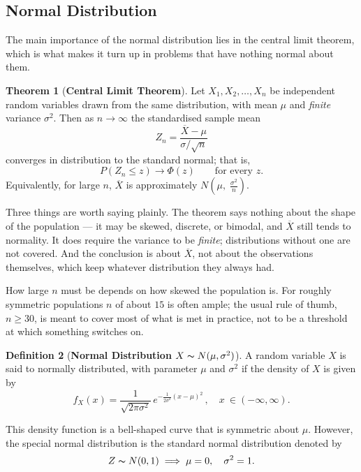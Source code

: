 \documentclass[12pt,a4paper]{report}
\theoremstyle{definition}
\newtheorem{thm}{Theorem}[section]
\newtheorem{definition}[thm]{Definition}
\theoremstyle{plain}
\theoremstyle{definition}
\begin{document}
\subsection{Normal Distribution}
\vspace{-15pt}
The main importance of the normal distribution lies in the central limit theorem, which is
what makes it turn up in problems that have nothing normal about them.

\begin{thm}[\textbf{Central Limit Theorem}]
Let $X_1, X_2, \ldots, X_n$ be independent random variables drawn from the same
distribution, with mean $\mu$ and \emph{finite} variance $\sigma^2$. Then as
$n\to\infty$ the standardised sample mean
\[Z_n=\frac{\overline{X}-\mu}{\sigma/\sqrt{n}}\]
converges in distribution to the standard normal; that is,
\[P(Z_n\leq z)\longrightarrow \Phi(z)\qquad\text{for every }z.\]
Equivalently, for large $n$, $\overline{X}$ is approximately
$N\!\left(\mu,\;\frac{\sigma^2}{n}\right)$.
\end{thm}

Three things are worth saying plainly. The theorem says nothing about the shape of the
population --- it may be skewed, discrete, or bimodal, and $\overline{X}$ still tends to
normality. It does require the variance to be \emph{finite}; distributions without one are
not covered. And the conclusion is about $\overline{X}$, not about the observations
themselves, which keep whatever distribution they always had.

How large $n$ must be depends on how skewed the population is. For roughly symmetric
populations $n$ of about $15$ is often ample; the usual rule of thumb, $n\geq 30$, is
meant to cover most of what is met in practice, not to be a threshold at which something
switches on. 



\begin{definition}[\textbf{Normal Distribution $X\thicksim N(\mu,\sigma^2)$}]
A random variable $X$ is said to normally distributed, with parameter $\mu$ and $\sigma^2$ if the density of $X$ is given by
\[f_X(x)=\frac{1}{\sqrt{2\pi \sigma^2}}\, e^{-\frac{1}{2\sigma^2}(x-\mu)^2}\, ,\quad x\ \in (-\infty,\infty).\]
\end{definition}


This density function is a bell-shaped curve that is symmetric about $\mu$. However, the special normal distribution is the standard normal distribution denoted by 
\[Z\thicksim N(0,1)\implies \mu =0,\quad \sigma^2=1.\]
\end{document}
